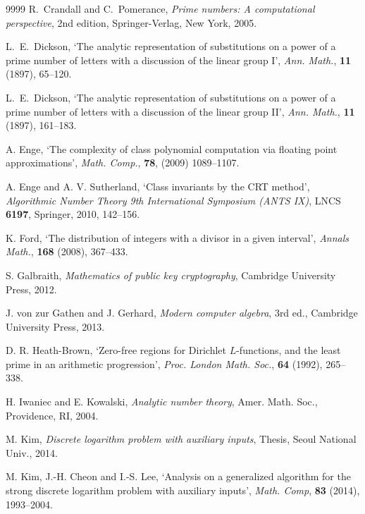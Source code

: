 \documentclass[12pt]{amsart}
\begin{document}
\begin{thebibliography}{9999}
 R.~Crandall and C.~Pomerance, {\it Prime numbers: A computational perspective\/}, 
2nd edition, Springer-Verlag, New York, 2005.

 L.~E.~Dickson, `The analytic representation of substitutions on a power of a prime number of letters with a discussion of the linear group I', {\it Ann. Math.\/}, {\bf 11} (1897), 65--120.

 L.~E.~Dickson, `The analytic representation of substitutions on a power of a prime number of letters with a discussion of the linear group II', {\it Ann. Math.\/}, {\bf 11} (1897), 161--183.

 A. Enge, `The complexity of class polynomial computation via floating point approximations', {\it Math. Comp.\/}, {\bf 78}, (2009) 1089--1107.

 A. Enge and A. V. Sutherland, `Class invariants by the CRT method', {\it Algorithmic Number Theory 9th International Symposium (ANTS IX)}, LNCS {\bf 6197}, Springer, 2010, 142--156.

 K. Ford, `The distribution of integers with a divisor in a given interval', {\it Annals Math.\/}, {\bf 168}  (2008), 367--433.

S. Galbraith, {\it Mathematics of public key cryptography\/},
Cambridge University Press, 2012.


J. von zur Gathen and J. Gerhard, {\it Modern computer algebra\/}, 3rd ed.,
Cambridge University Press, 2013.

 D. R. Heath-Brown, `Zero-free regions for Dirichlet 
$L$-functions, and the least prime
in an arithmetic progression', 
{\it Proc. London Math. Soc.\/}, {\bf 64} (1992), 265--338.


 H. Iwaniec and E. Kowalski,
{\it Analytic number theory\/}, Amer.  Math.  Soc.,
Providence, RI, 2004.

M. Kim, {\it Discrete logarithm problem with auxiliary inputs\/}, 
Thesis, Seoul National Univ., 2014.

M. Kim, J.-H. Cheon and I.-S. Lee, `Analysis on a generalized 
algorithm for the strong discrete logarithm problem with auxiliary inputs', {\it Math. Comp\/},  {\bf 83} (2014),  1993--2004. 


\end{thebibliography}
\end{document}
